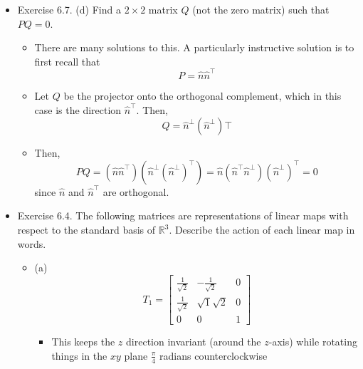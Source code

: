 \documentclass{article}
\begin{document}
\begin{itemize}
\begin{itemize}
\begin{itemize}
            \item Vectors which have zero projection along $\hat{n}$ must be orthogonal to it. A unit vector orthogonal to $\hat{n}$ is $\hat{n}^\perp = (-\sin(\theta),\cos(\theta))^\top$, and so the eigenvectors with eignevalue $\lambda=0$ are proportional to $\hat{n}^\perp$.
            \item On the other hand, vectors which are unchanged by projection must already lie fully along $\hat{n}$. Thus, the eigenvectors with eigenvalue $\lambda=1$ are simply scalar multiples of $\hat{n} = (\cos(\theta),\sin(\theta))^\top$ itself.
        \end{itemize}
    \end{itemize}
    \item Exercise 6.7. (d) Find a $2 \times 2$ matrix $Q$ (not the zero matrix) such that $PQ=0$.
    \begin{itemize}
        \item There are many solutions to this. A particularly instructive solution is to first recall that
        \[
        P = \hat{n}\hat{n}^\top
        \]
        \item Let $Q$ be the projector onto the orthogonal complement, which in this case is the direction $\hat{n}^\top$. Then,
        \[
        Q = \hat{n}^\perp (\hat{n}^\perp)\top
        \]
        \item Then,
        \[
        PQ = (\hat{n}\hat{n}^\top)(\hat{n}^\perp (\hat{n}^\perp)^\top) = \hat{n}(\hat{n}^\top\hat{n}^\perp)(\hat{n}^\perp)^\top = 0
        \]
        since $\hat{n}$ and $\hat{n}^\top$ are orthogonal.
    \end{itemize}
    \item Exercise 6.4. The following matrices are representations of linear maps with respect to the standard basis of $\mathbb{R}^3$. Describe the action of each linear map in words.
    \begin{itemize}
        \item (a)
        \[
        T_1 = \left[ \begin{array}{ccc}
            \frac{1}{\sqrt{2}} & -\frac{1}{\sqrt{2}} & 0 \\
            \frac{1}{\sqrt{2}} & \sqrt{1}{\sqrt{2}} & 0 \\
            0 & 0 & 1
        \end{array} \right]
        \]
        \begin{itemize}
            \item This keeps the $z$ direction invariant (around the $z$-axis) while rotating things in the $xy$ plane $\frac{\pi}{4}$ radians counterclockwise

\end{itemize}
\end{itemize}
\end{itemize}
\end{document}
